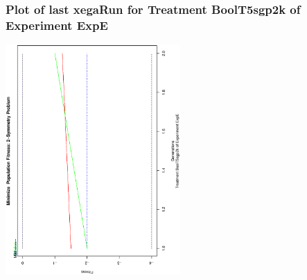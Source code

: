  \begin{frame}
 \frametitle{ Plot of last xegaRun for Treatment BoolT5sgp2k of Experiment ExpE }
 \begin{center}
\includegraphics[width=0.5\textwidth, angle=-90]
{ExpEPlotPopStatsFigure005.eps}
 \end{center}
 \label{report/ExpEPlotPopStatsFigure005.eps}  
 \end{frame}

